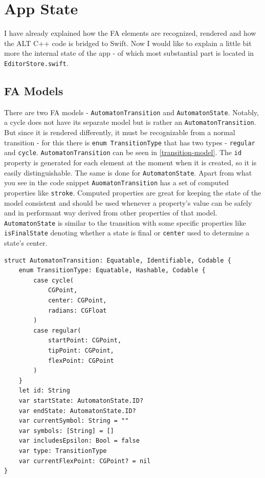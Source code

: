 \section{App State}

I have already explained how the FA elements are recognized, rendered and how the ALT C++ code is bridged to Swift. Now I would like to explain a little bit more the internal state of the app - of which most substantial part is located in \lstinline{EditorStore.swift}.

\subsection{FA Models}

There are two FA models - \lstinline{AutomatonTransition} and \lstinline{AutomatonState}. Notably, a cycle does not have its separate model but is rather an \lstinline{AutomatonTransition}. But since it is rendered differently, it must be recognizable from a normal transition - for this there is \lstinline{enum TransitionType} that has two types - \lstinline{regular} and \lstinline{cycle}. \lstinline{AutomatonTransition} can be seen in \ref{transition-model}. The \lstinline{id} property is generated for each element at the moment when it is created, so it is easily distinguishable. The same is done for \lstinline{AutomatonState}.  Apart from what you see in the code snippet \lstinline{AuomatonTransition} has a set of computed properties like \lstinline{stroke}. Computed properties are great for keeping the state of the model consistent and should be used whenever a property's value can be safely and in performant way derived from other properties of that model. \lstinline{AutomatonState} is similar to the transition with some specific properties like \lstinline{isFinalState} denoting whether a state is final or \lstinline{center} used to determine a state's center.

\begin{lstlisting}[caption={Transition model}, label=transition-model]
struct AutomatonTransition: Equatable, Identifiable, Codable {
    enum TransitionType: Equatable, Hashable, Codable {
        case cycle(
            CGPoint, 
            center: CGPoint, 
            radians: CGFloat
        )
        case regular(
            startPoint: CGPoint, 
            tipPoint: CGPoint, 
            flexPoint: CGPoint
        )
    }
    let id: String
    var startState: AutomatonState.ID?
    var endState: AutomatonState.ID?
    var currentSymbol: String = ""
    var symbols: [String] = []
    var includesEpsilon: Bool = false
    var type: TransitionType
    var currentFlexPoint: CGPoint? = nil
}
\end{lstlisting}

